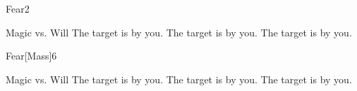 \begin{spellsection}{Fear}{2}
    \begin{spellheader}
    \end{spellheader}
    \begin{spellcontent}
        \begin{spelltargetinginfo}
        \end{spelltargetinginfo}
        \begin{spelleffects}
            \begin{spellattack}{Magic vs. Will}
                \spellsuccess The target is \frightened by you.
                \spellcritical The target is \panicked by you.
                \spellfailure The target is \shaken by you.
            \end{spellattack}
            \spelldur \durshort \dismissable
        \end{spelleffects}
    \end{spellcontent}
    \begin{spellfooter}
        \miscastrandom
    \end{spellfooter}
\end{spellsection}

\begin{spellsection}{Fear}[Mass]{6}
    \begin{spellheader}
    \end{spellheader}
    \begin{spellcontent}
        \begin{spelltargetinginfo}
        \end{spelltargetinginfo}
        \begin{spelleffects}
            \begin{spellattack}{Magic vs. Will}
                \spellsuccess The target is \frightened by you.
                \spellcritical The target is \panicked by you.
                \spellfailure The target is \shaken by you.
            \end{spellattack}
            \spelldur \durshort \dismissable
        \end{spelleffects}
    \end{spellcontent}
    \begin{spellfooter}
        \miscastexplode
    \end{spellfooter}
\end{spellsection}

